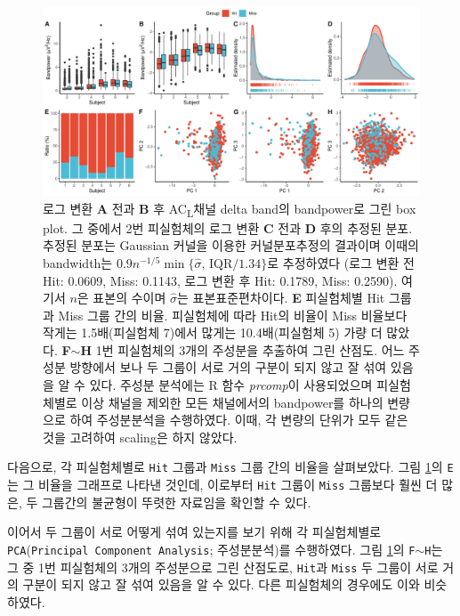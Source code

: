 \documentclass[10pt,onecolumn,twoside,a4size]{gsag3jnl}
\newcommand{\ACL}{AC\textsubscript{L}}
\begin{document}
\begin{figure}[tp]
  \renewcommand{\familydefault}{\sfdefault}\normalfont
  \centering
  \includegraphics[width=\linewidth]{EDA.pdf}
  \caption{\small 로그 변환 \textbf{A} 전과 \textbf{B} 후 \ACL 채널 delta band의 bandpower로 그린 box plot. 그 중에서 2번 피실험체의 로그 변환 \textbf{C} 전과 \textbf{D} 후의 추정된 분포. 추정된 분포는 Gaussian 커널을 이용한 커널분포추정의 결과이며 이때의 bandwidth는 $0.9n^{-1/5}\min\{\widehat{\sigma},\,\mathrm{IQR}/1.34\}$로 추정하였다 (로그 변환 전 Hit: 0.0609, Miss: 0.1143, 로그 변환 후 Hit: 0.1789, Miss: 0.2590). 여기서 $n$은 표본의 수이며 $\widehat{\sigma}$는 표본표준편차이다. \textbf{E} 피실험체별 {Hit} 그룹과 {Miss} 그룹 간의 비율. 피실험체에 따라 {Hit}의 비율이 {Miss} 비율보다 작게는 1.5배(피실험체 7)에서 많게는 10.4배(피실험체 5) 가량 더 많았다. \textbf{F}$\sim$\textbf{H} 1번 피실험체의 3개의 주성분을 추출하여 그린 산점도. 어느 주성분 방향에서 보나 두 그룹이 서로 거의 구분이 되지 않고 잘 섞여 있음을 알 수 있다. 주성분 분석에는 R 함수 \textrm{\textit{prcomp}}이 사용되었으며 피실험체별로 이상 채널을 제외한 모든 채널에서의 bandpower를 하나의 변량으로 하여 주성분분석을 수행하였다. 이때, 각 변량의 단위가 모두 같은 것을 고려하여 scaling은 하지 않았다.}
  \label{fig:EDA}
\end{figure}

다음으로, 각 피실험체별로 \texttt{Hit} 그룹과 \texttt{Miss} 그룹 간의 비율을 살펴보았다. 그림 \ref{fig:EDA}의 \texttt{E}는 그 비율을 그래프로 나타낸 것인데, 이로부터 \texttt{Hit} 그룹이 \texttt{Miss} 그룹보다 훨씬 더 많은, 두 그룹간의 불균형이 뚜렷한 자료임을 확인할 수 있다.

이어서 두 그룹이 서로 어떻게 섞여 있는지를 보기 위해 각 피실험체별로 \texttt{PCA}(\texttt{Principal Component Analysis}; 주성분분석)를 수행하였다. 그림 \ref{fig:EDA}의 \texttt{F}$\sim$\texttt{H}는 그 중 1번 피실험체의 3개의 주성분으로 그린 산점도로, \texttt{Hit}과 \texttt{Miss} 두 그룹이 서로 거의 구분이 되지 않고 잘 섞여 있음을 알 수 있다. 다른 피실험체의 경우에도 이와 비슷하였다.
\end{document}

